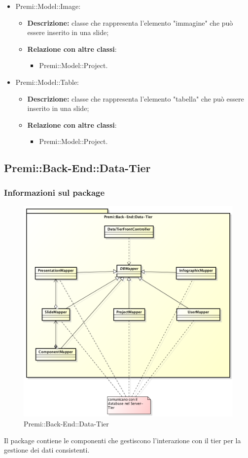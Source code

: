 \begin{itemize}
		\item Premi::Model::Image:
		\begin{itemize}
			\item \textbf{Descrizione:} classe che rappresenta l'elemento "immagine" che può essere inserito in una \gls{slide};
			\item \textbf{Relazione con altre classi}:
			\begin{itemize}
				\item Premi::Model::Project.
			\end{itemize}
		\end{itemize}
		
		\item Premi::Model::Table:
		\begin{itemize}
			\item \textbf{Descrizione:} classe che rappresenta l'elemento "tabella" che può essere inserito in una \gls{slide};
			\item \textbf{Relazione con altre classi}:
			\begin{itemize}
				\item Premi::Model::Project.
			\end{itemize}
		\end{itemize}
	\end{itemize}

\newpage

\subsection{Premi::Back-End::Data-Tier}
	\subsubsection*{Informazioni sul package}
		\begin{figure}[h]
			\centering
			\includegraphics[width=0.9\linewidth]{img/back-end_data-tier}
			\caption[Premi::Back-End::Data-Tier]{Premi::Back-End::Data-Tier}
		\end{figure}
		Il package contiene le componenti che gestiscono l'interazione con il tier per la gestione dei dati consistenti.
		
